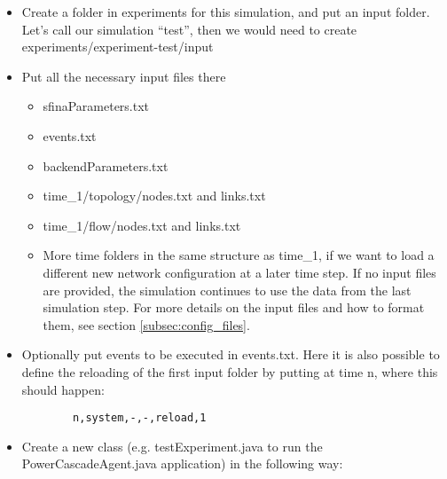 \documentclass[11pt,fleqn]{book} %
\begin{document}
\begin{itemize}
	\item Create a folder in experiments for this simulation, and put an input folder. Let’s call our simulation “test”, then we would need to create experiments/experiment-test/input
	\item Put all the necessary input files there
	\begin{itemize}
		\item sfinaParameters.txt
		\item events.txt
		\item backendParameters.txt
		\item time\_1/topology/nodes.txt and links.txt
		\item time\_1/flow/nodes.txt and links.txt
		\item More time folders in the same structure as time\_1, if we want to load a different new network configuration at a later time step. If no input files are provided, the simulation continues to use the data from the last simulation step. For more details on the input files and how to format them, see section \ref{subsec:config_files}.
	\end{itemize}
	\item Optionally put events to be executed in events.txt. Here it is also possible to define the reloading of the first input folder by putting at time n, where this should happen:
	\begin{lstlisting}
		n,system,-,-,reload,1
	\end{lstlisting}
	\item  Create a new class (e.g. testExperiment.java to run the PowerCascadeAgent.java application) in the following way:
\end{itemize}
\end{document}
